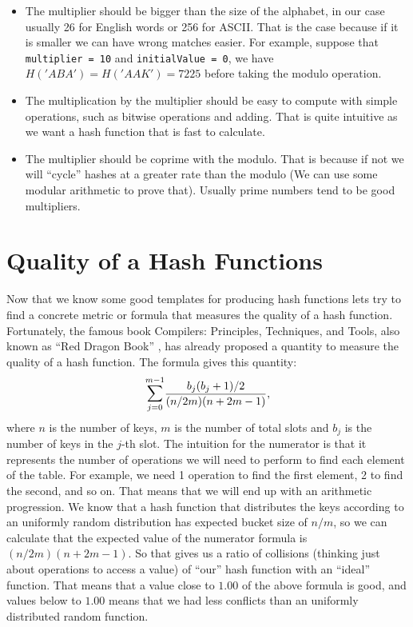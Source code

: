 \begin{itemize}
\item The multiplier should be bigger than the size of the alphabet, in our case usually 26 for English words or 256 for ASCII. That is the case because if it is smaller we can have wrong matches easier. For example, suppose that \texttt{multiplier = 10} and \texttt{initialValue = 0}, we have \( H('ABA') = H('AAK') = 7225 \) before taking the modulo operation.

\item The multiplication by the multiplier should be easy to compute with simple operations, such as bitwise operations and adding. That is quite intuitive as we want a hash function that is fast to calculate. 

\item The multiplier should be coprime with the modulo. That is because if not we will ``cycle'' hashes at a greater rate than the modulo (We can use some modular arithmetic to prove that). Usually prime numbers tend to be good multipliers.
\end{itemize}

\section{Quality of a Hash Functions}

Now that we know some good templates for producing hash functions lets try to find a concrete metric or formula that measures the quality of a hash function. Fortunately, the famous book Compilers: Principles, Techniques, and Tools, also known as ``Red Dragon Book'' \citep{DragonBook}, has already proposed a quantity to measure the quality of a hash function. The formula gives this quantity:
\[ \mathlarger{\sum}_{j = 0}^{m - 1} \frac{b_j(b_j + 1)/2}{ (n/2m)(n + 2m - 1) }, \]
where \( n \) is the number of keys, \( m \) is the number of total slots and \( b_j \) is the number of keys in the \( j \)-th slot. The intuition for the numerator is that it represents the number of operations we will need to perform to find each element of the table. For example, we need 1 operation to find the first element, 2 to find the second, and so on. That means that we will end up with an arithmetic progression. We know that a hash function that distributes the keys according to an uniformly random distribution has expected bucket size of \( n / m \), so we can calculate that the expected value of the numerator formula is \( (n/2m)(n + 2m - 1) \). So that gives us a ratio of collisions (thinking just about operations to access a value) of ``our'' hash function with an ``ideal'' function. That means that a value close to \( 1.00 \) of the above formula is good, and values below to \( 1.00 \) means that we had less conflicts than an uniformly distributed random function.

